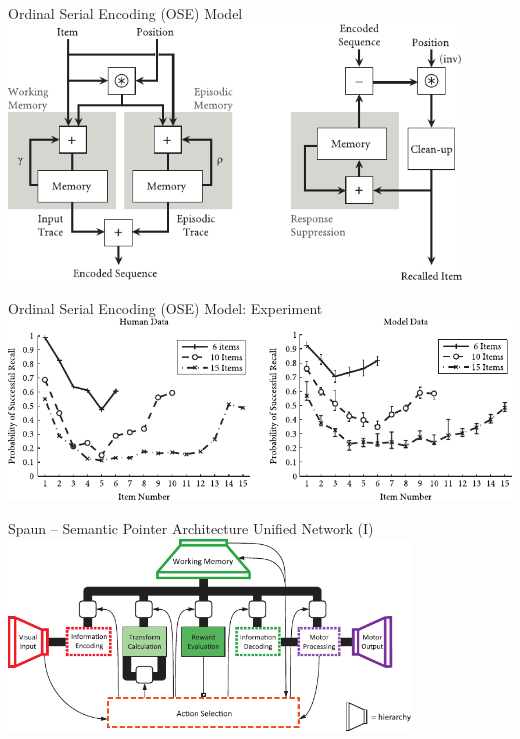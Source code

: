 \documentclass[handout,aspectratio=169]{beamer}
\begin{document}
	\begin{frame}{Ordinal Serial Encoding (OSE) Model}
		\centering
		\includegraphics[width=0.9\textwidth]{media/htbab_ose.pdf}
	\end{frame}

	\begin{frame}{Ordinal Serial Encoding (OSE) Model: Experiment}
		\centering
		\includegraphics[width=\textwidth]{media/htbab_ose_experiment.pdf}
	\end{frame}

  \begin{frame}{Spaun -- Semantic Pointer Architecture Unified Network (I)}
		\centering
		\includegraphics[width=0.8\textwidth]{media/eliasmith_2012_spaun_architecture.pdf}
	\end{frame}
	
\end{document}
